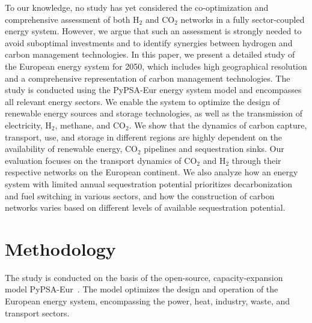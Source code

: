 \documentclass[twocolumn]{article}
\newcommand{\carbon}{CO$_2$}
\newcommand{\hydrogen}{H$_2$}
\begin{document}
To our knowledge, no study has yet considered the co-optimization and comprehensive assessment of both \hydrogen{} and \carbon{} networks in a fully sector-coupled energy system. However, we argue that such an assessment is strongly needed to avoid suboptimal investments and to identify synergies between hydrogen and carbon management technologies. In this paper, we present a detailed study of the European energy system for 2050, which includes high geographical resolution and a comprehensive representation of carbon management technologies. The study is conducted using the PyPSA-Eur energy system model and encompasses all relevant energy sectors. We enable the system to optimize the design of renewable energy sources and storage technologies, as well as the transmission of electricity, \hydrogen{}, methane, and \carbon{}. We show that the dynamics of carbon capture, transport, use, and storage in different regions are highly dependent on the availability of renewable energy, \carbon{} pipelines and sequestration sinks. Our evaluation focuses on the transport dynamics of \carbon{} and \hydrogen{} through their respective networks on the European continent. We also analyze how an energy system with limited annual sequestration potential prioritizes decarbonization and fuel switching in various sectors, and how the construction of carbon networks varies based on different levels of available sequestration potential.


\section{Methodology}
\label{sec:methodology}

The study is conducted on the basis of the open-source, capacity-expansion model PyPSA-Eur~\cite{horschPyPSAEurOpenOptimisation2018,brownSynergiesSectorCoupling2018,PyPSAEurSecSectorCoupledOpen2023}.
The model optimizes the design and operation of the European energy system, encompassing the power, heat, industry, waste, and transport sectors.
\end{document}
